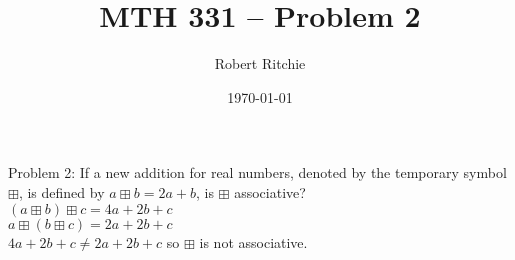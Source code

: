 \documentclass[11pt]{article}
\begin{document}
\author{Robert Ritchie}
\title{MTH 331 -- Problem 2}
\date{\today}

\maketitle
Problem 2: If a new addition for real numbers, denoted by the temporary symbol $\boxplus$, is defined by $a \boxplus b = 2a + b$, is $\boxplus$ associative? \\
$(a \boxplus b)\boxplus c = 4a + 2b + c$\\
 $a \boxplus (b \boxplus c) = 2a +2b+ c$\\
  $4a+2b+c \neq 2a+2b+c$ so $\boxplus$ is not associative.
\end{document}
